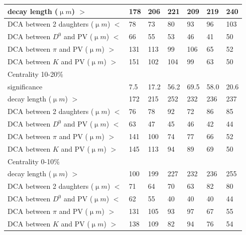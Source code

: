 \begin{table}[htp]
\begin{center}
\begin{tabular}{l|l|l|l|l|l|l}
      decay length (${\upmu}m$) $>$ & 178 & 206 & 221 & 209 & 219 & 240\\ \hline
      DCA between 2 daughters (${\upmu}m$) $<$ & 78 & 73 & 80 & 93 & 96 & 103\\ \hline
      DCA between $D^0$ and PV (${\upmu}m$) $<$ & 66 & 55 & 53 & 46 & 41 & 50\\ \hline
      DCA between $\pi$ and PV (${\upmu}m$) $>$ & 131 & 113 & 99 & 106 & 65 & 52\\ \hline
      DCA between $K$ and PV (${\upmu}m$) $>$ & 151 & 102 & 104 & 99 & 63 & 50\\ \hline
      Centrality  10-20\% &  &  &  &  & & \\ \hline
      significance & 7.5 & 17.2 & 56.2 & 69.5 & 58.0 & 20.6\\ \hline
      decay length (${\upmu}m$) $>$ & 172 & 215 & 252 & 232 & 236 & 237\\ \hline
      DCA between 2 daughters (${\upmu}m$) $<$ & 76 & 78 & 92 & 72 & 86 & 85\\ \hline
      DCA between $D^0$ and PV (${\upmu}m$) $<$ & 63 & 47 & 45 & 46 & 42 & 44\\ \hline
      DCA between $\pi$ and PV (${\upmu}m$) $>$ & 141 & 100 & 74 & 77 & 66 & 52\\ \hline
      DCA between $K$ and PV (${\upmu}m$) $>$ & 145 & 113 & 94 & 89 & 69 & 50\\ \hline
      Centrality  0-10\% &  &  &  &  & & \\ \hline
      decay length (${\upmu}m$) $>$ & 100 & 199 & 227 & 232 & 236 & 255\\ \hline
      DCA between 2 daughters (${\upmu}m$) $<$ & 71 & 64 & 70 & 63 & 82 & 80\\ \hline
      DCA between $D^0$ and PV (${\upmu}m$) $<$ & 62 & 55 & 40 & 40 & 40 & 44\\ \hline
      DCA between $\pi$ and PV (${\upmu}m$) $>$ & 131 & 105 & 93 & 97 & 67 & 55\\ \hline
      DCA between $K$ and PV (${\upmu}m$) $>$ & 138 & 109 & 82 & 94 & 76 & 54\\ \hline
    \end{tabular}
  \end{center}
\end{table}

